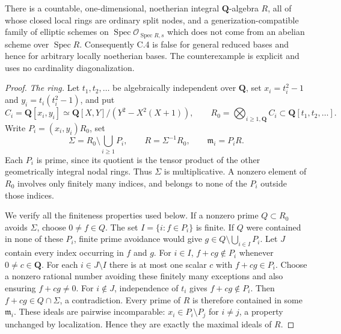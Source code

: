 \begin{theorem}
\label{thm:C-RD10}
There is a countable, one-dimensional, noetherian integral
$\mathbf Q$-algebra $R$, all of whose closed local rings are ordinary
split nodes, and a generization-compatible family of elliptic schemes
on $\operatorname{Spec}\mathcal O_{\operatorname{Spec}R,s}$ which does
not come from an abelian scheme over $\operatorname{Spec}R$.
Consequently C.4 is false for general reduced bases and hence for
arbitrary locally noetherian bases. The counterexample is explicit
and uses no cardinality diagonalization.
\end{theorem}
\begin{proof}
\emph{The ring.} Let $t_1,t_2,\ldots$ be algebraically independent over
$\mathbf Q$, set $x_i=t_i^2-1$ and $y_i=t_i(t_i^2-1)$, and put
\[
 C_i=\mathbf Q[x_i,y_i]
   \simeq\mathbf Q[X,Y]/(Y^2-X^2(X+1)),\qquad
 R_0=\bigotimes_{i\geq1,\mathbf Q} C_i\subset\mathbf Q[t_1,t_2,\ldots].
\]
Write $P_i=(x_i,y_i)R_0$, set
\[
 \Sigma=R_0\setminus\bigcup_{i\geq1}P_i,
 \qquad R=\Sigma^{-1}R_0,
 \qquad \mathfrak m_i=P_iR.
\]
Each $P_i$ is prime, since its quotient is the tensor product of the
other geometrically integral nodal rings. Thus $\Sigma$ is
multiplicative. A nonzero element of $R_0$ involves only finitely many
indices, and belongs to none of the $P_i$ outside those indices.

We verify all the finiteness properties used below. If a nonzero prime
$Q\subset R_0$ avoids $\Sigma$, choose $0\ne f\in Q$. The set
$I=\{i:f\in P_i\}$ is finite. If $Q$ were contained in none of these
$P_i$, finite prime avoidance would give
$g\in Q\setminus\bigcup_{i\in I}P_i$. Let $J$ contain every index
occurring in $f$ and $g$. For $i\in I$, $f+cg\notin P_i$ whenever
$0\ne c\in\mathbf Q$. For each $i\in J\setminus I$ there is at most
one scalar $c$ with $f+cg\in P_i$. Choose a nonzero rational number
avoiding these finitely many exceptions and also ensuring $f+cg\ne0$.
For $i\notin J$, independence of $t_i$ gives $f+cg\notin P_i$.
Then $f+cg\in Q\cap\Sigma$, a contradiction. Every prime of $R$
is therefore contained in some $\mathfrak m_i$. These ideals are
pairwise incomparable: $x_i\in P_i\setminus P_j$ for $i\ne j$, a
property unchanged by localization. Hence they are exactly the
maximal ideals of $R$.


\end{proof}
